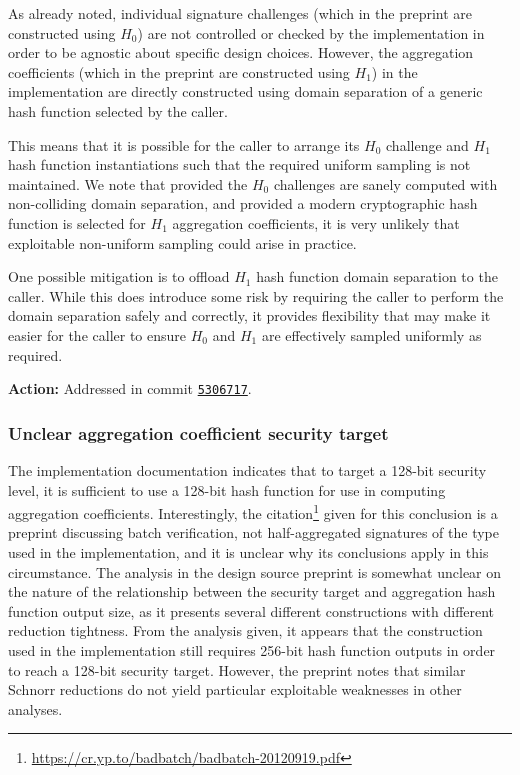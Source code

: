 \documentclass{article}
\begin{document}
As already noted, individual signature challenges (which in the preprint are constructed using $H_0$) are not controlled or checked by the implementation in order to be agnostic about specific design choices.
However, the aggregation coefficients (which in the preprint are constructed using $H_1$) in the implementation are directly constructed using domain separation of a generic hash function selected by the caller.

This means that it is possible for the caller to arrange its $H_0$ challenge and $H_1$ hash function instantiations such that the required uniform sampling is not maintained.
We note that provided the $H_0$ challenges are sanely computed with non-colliding domain separation, and provided a modern cryptographic hash function is selected for $H_1$ aggregation coefficients, it is very unlikely that exploitable non-uniform sampling could arise in practice.

One possible mitigation is to offload $H_1$ hash function domain separation to the caller.
While this does introduce some risk by requiring the caller to perform the domain separation safely and correctly, it provides flexibility that may make it easier for the caller to ensure $H_0$ and $H_1$ are effectively sampled uniformly as required.

\textbf{Action:} Addressed in commit \href{https://github.com/serai-dex/serai/commit/530671795ada0f42f593d680cf892ee222047af2}{\texttt{5306717}}.


\subsubsection{Unclear aggregation coefficient security target}

The implementation documentation indicates that to target a 128-bit security level, it is sufficient to use a 128-bit hash function for use in computing aggregation coefficients.
Interestingly, the citation\footnote{\url{https://cr.yp.to/badbatch/badbatch-20120919.pdf}} given for this conclusion is a preprint discussing batch verification, not half-aggregated signatures of the type used in the implementation, and it is unclear why its conclusions apply in this circumstance.
The analysis in the design source preprint is somewhat unclear on the nature of the relationship between the security target and aggregation hash function output size, as it presents several different constructions with different reduction tightness.
From the analysis given, it appears that the construction used in the implementation still requires 256-bit hash function outputs in order to reach a 128-bit security target.
However, the preprint notes that similar Schnorr reductions do not yield particular exploitable weaknesses in other analyses.
\end{document}
